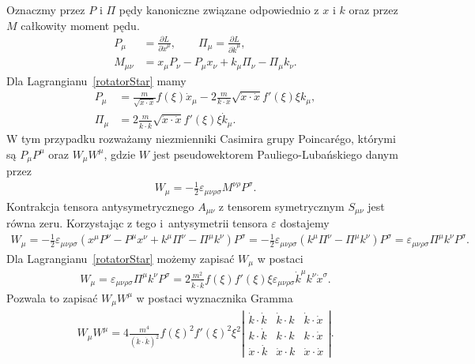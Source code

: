 Oznaczmy przez $P$ i $\Pi$ pędy kanoniczne związane 
odpowiednio z $x$ i $k$ oraz przez $M$ całkowity moment pędu.
\begin{align*}
P_\mu &= \frac{\partial L}{\partial \dot{x}^\mu}, \qquad
\Pi_\mu = \frac{\partial L}{\partial \dot{k}^\mu}, \\
M_{\mu\nu} &= x_\mu P_\nu - P_\mu x_\nu + k_\mu \Pi_\nu - \Pi_\mu k_\nu.
\end{align*}
Dla Lagrangianu~\eqref{rotatorStar} mamy 
\begin{align*}
P_\mu &=  \frac{m}{\sqrt{ \dot{x} \cdot \dot{x} }} f(\xi) \dot{x}_\mu 
- 2 \frac{m}{k \cdot \dot{x}} \sqrt{ \dot{x} \cdot \dot{x} }
f'(\xi) \xi k_\mu , \\
\Pi_\mu &= 2 \frac{m}{\dot{k} \cdot \dot{k}} \sqrt{ \dot{x} \cdot \dot{x} }
f'(\xi) \xi \dot{k}_\mu .
\end{align*}
W tym przypadku rozważamy niezmienniki Casimira grupy 
Poincarégo, którymi są
$P_\mu P^\mu$ oraz
$W_\mu W^\mu$, gdzie $W$ jest pseudowektorem Pauliego-Lubańskiego 
danym przez
\begin{align*}
W_\mu = - \frac{1}{2} \varepsilon_{\mu\nu\rho\sigma}
M^{\nu\rho} P^\sigma.
\end{align*}
Kontrakcja tensora antysymetrycznego $A_{\mu\nu}$ z 
tensorem symetrycznym $S_{\mu\nu}$ jest równa zeru. 
Korzystając z tego i~antysymetrii tensora $\varepsilon$ dostajemy
\begin{align*}
W_\mu = - \frac{1}{2} \varepsilon_{\mu\nu\rho\sigma}
(x^\mu P^\nu - P^\mu x^\nu + k^\mu \Pi^\nu - \Pi^\mu k^\nu) P^\sigma = 
 - \frac{1}{2} \varepsilon_{\mu\nu\rho\sigma}
( k^\mu \Pi^\nu - \Pi^\mu k^\nu) P^\sigma = 
  \varepsilon_{\mu\nu\rho\sigma}
 \Pi^\mu k^\nu P^\sigma .
\end{align*}
Dla Lagrangianu~\eqref{rotatorStar} możemy zapisać $W_\mu$ w postaci
\begin{align*}
W_\mu =  \varepsilon_{\mu\nu\rho\sigma}  \Pi^\mu k^\nu P^\sigma =
2\frac{m^2}{ \dot{k} \cdot \dot{k}} 
f(\xi) f'(\xi) \xi \varepsilon_{\mu\nu\rho\sigma} 
 \dot{k}^\mu k^\nu \dot{x}^\sigma .
\end{align*}
Pozwala to zapisać $W_\mu W^\mu$ w postaci wyznacznika Gramma
\begin{align*}
W_\mu W^\mu = 
4 \frac{m^4}{ (\dot{k} \cdot \dot{k})^2} 
f(\xi)^2 f'(\xi)^2 \xi^2 
\left| 
\begin{array}{ccc}
\dot{k} \cdot \dot{k}& \dot{k} \cdot k& \dot{k} \cdot \dot{x}\\
k \cdot \dot{k}& k \cdot k &k  \cdot \dot{x}\\
\dot{x} \cdot \dot{k}& \dot{x} \cdot k &\dot{x} \cdot \dot{x}
\end{array}
\right|.
\end{align*}

